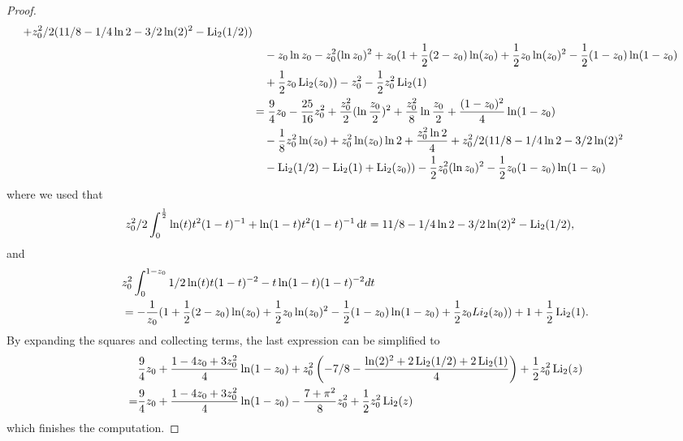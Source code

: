 \begin{proof}
\begin{align*}
		+z_0^2/2(11/8 -1/4 \ln 2 -3/2\ln(2)^2 -  \operatorname{Li}_2(1/2)) \\
	&\hspace{10pt}-z_0 \ln z_0-z_0^2(\ln z_0)^2+z_0(1 + \frac{1}{2}(2-z_0) \ln(z_0) 
		+ \frac{1}{2}z_0 \ln(z_0)^2 - \frac{1}{2} (1-z_0) \ln(1-z_0) \\
	&\hspace{10pt}+\frac{1}{2}z_0 \operatorname{Li}_2(z_0)) - z_0^2   -\frac{1}{2}  z_0^2\operatorname{Li}_2(1) \\
	&=\frac{9}{4}z_0-\frac{25}{16}z_0^2 +\frac{z_0^2}{2}(\ln\frac{z_0}{2})^2+\frac{z_0^2}{8}\ln\frac{z_0}{2} 
		+\frac{(1-z_0)^2}{4}\ln(1-z_0) \\
	&\hspace{10pt}-\frac{1}{8}z_0^2\ln(z_0)+z_0^2\ln(z_0)\ln 2+\frac{z_0^2 \ln2}{4}
		+z_0^2/2(11/8 -1/4 \ln 2 -3/2\ln(2)^2 \\
	&\hspace{10pt}- \operatorname{Li}_2(1/2)-\operatorname{Li}_2(1)+\operatorname{Li}_2(z_0)) -\frac{1}{2}z_0^2(\ln z_0)^2 - \frac{1}{2} z_0(1-z_0) \ln(1-z_0)
\end{align*}
where we used that
\begin{align*}
	z_0^2/2\int_0^{\frac{1}{2}} \ln(t)t^2(1-t)^{-1}+\ln(1-t)t^2(1-t)^{-1} \operatorname{\mathrm{d}\hspace{-2pt}} t
	&= 11/8 -1/4 \ln 2 -3/2\ln(2)^2 -  \operatorname{Li}_2(1/2),
\end{align*}
and
\begin{align*}
	&z_0^2\int_0^{1-z_0} 1/2\ln(t)t(1-t)^{-2}-t\ln(1-t)(1-t)^{-2}dt\\
	&= -\frac{1}{z_0} (1 + \frac{1}{2}(2-z_0) \ln(z_0) + \frac{1}{2}z_0 \ln(z_0)^2 - \frac{1}{2} (1-z_0) \ln(1-z_0) +\frac{1}{2}z_0 Li_2(z_0))+1   +\frac{1}{2}  \operatorname{Li}_2(1).
\end{align*}
By expanding the squares and collecting terms, the last expression can be simplified to
\begin{align*}
&\frac{9}{4} z_0 + \frac{1 - 4 z_0 + 3 z_0^2}{4}\ln(1 - z_0) + 
z_0^2 \left(-7/8 - \frac{\ln(2)^2+2\operatorname{Li}_2(1/2) + 2\operatorname{Li}_2(1)}{4} \right) + 
\frac{1}{2}z_0^2 \operatorname{Li}_2(z) \\
=&\frac{9}{4} z_0 + \frac{1 - 4 z_0 + 3 z_0^2}{4}\ln(1 - z_0) - \frac{7+\pi^2}{8}
z_0^2  + 
\frac{1}{2}z_0^2 \operatorname{Li}_2(z)
\end{align*}
which finishes the computation.
\end{proof}



